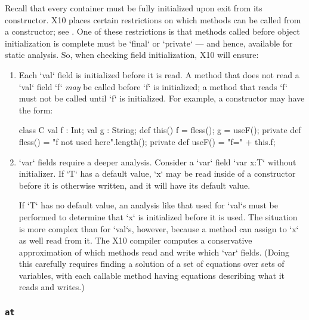 Recall that every container must be fully initialized upon exit
from its constructor.  
X10 places certain restrictions on which methods can be called from a
constructor; see .  One of these restrictions is that
methods called before object initialization is complete must be \xcd`final` or
\xcd`private` --- and hence, available for static analysis.  So, when checking
field initialization, X10 will ensure: 
\begin{enumerate}
\item Each \xcd`val` field is initialized before it is read.   
      A method that does not read a \xcd`val` field \xcd`f` {\em may} be
      called before \xcd`f` is initialized; a method that reads \xcd`f` must
      not be called until \xcd`f` is initialized.        
      For example, 
      a constructor may have the form:
\begin{xten}
class C {
  val f : Int;
  val g : String;
  def this() {
     f = fless();
     g = useF();
  }
  private def fless() = "f not used here".length();
  private def useF() = "f=" + this.f;
}
\end{xten}
%

\item \xcd`var` fields require a deeper analysis.  Consider a \xcd`var`
      field \xcd`var x:T`  without initializer.  If \xcd`T` has a default
      value, \xcd`x` may be read inside of a constructor before it is
      otherwise written, and it will 
      have its default value.   

      If \xcd`T` has no default value, an analysis
      like that used for \xcd`val`s must be performed to determine that
      \xcd`x` is initialized before it is used.  The situation is 
      more complex than for \xcd`val`s, however, because a method can assign to
      \xcd`x` as well read from it.  The X10 compiler computes a conservative
      approximation of which methods
      read and write which \xcd`var` fields. (Doing this carefully 
      requires finding a solution of a set of equations over sets of
      variables, with each callable method having equations describing what it
      reads and writes.)    

\end{enumerate}


\subsubsection{{\tt at} 
}

